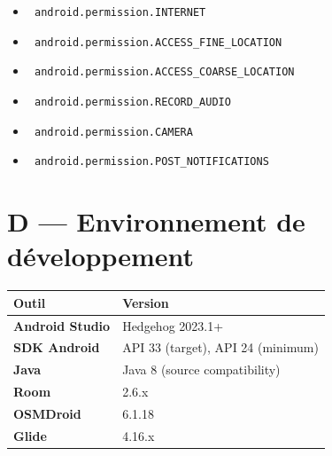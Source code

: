 \documentclass[a4paper,12pt,openany]{report}
\newcommand{\ic}[1]{\texttt{\small\colorbox{lightbg}{\color{navy!90} #1}}}
\begin{document}
\begin{itemize}
  \item \ic{android.permission.INTERNET}
  \item \ic{android.permission.ACCESS\_FINE\_LOCATION}
  \item \ic{android.permission.ACCESS\_COARSE\_LOCATION}
  \item \ic{android.permission.RECORD\_AUDIO}
  \item \ic{android.permission.CAMERA}
  \item \ic{android.permission.POST\_NOTIFICATIONS}
\end{itemize}

\section*{D — Environnement de développement}

\begin{tabularx}{\textwidth}{>{\bfseries}l X}
  \toprule
  Outil & Version \\
  \midrule
  Android Studio    & Hedgehog 2023.1+ \\
  SDK Android       & API 33 (target), API 24 (minimum) \\
  Java              & Java 8 (source compatibility) \\
  Room              & 2.6.x \\
  OSMDroid          & 6.1.18 \\
  Glide             & 4.16.x \\
  \bottomrule
\end{tabularx}
\end{document}
